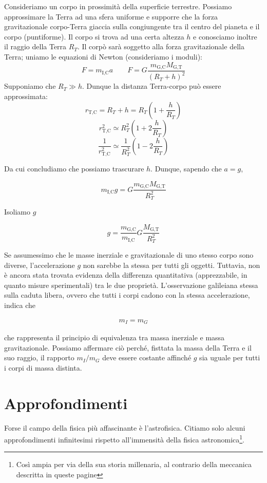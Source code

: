 Consideriamo un corpo in prossimità della superficie terrestre. Possiamo approssimare
la Terra ad una sfera uniforme e supporre che la forza gravitazionale corpo-Terra
giaccia sulla congiungente tra il centro del pianeta e il corpo (puntiforme). Il
corpo si trova ad una certa altezza $h$ e conosciamo inoltre il raggio della Terra
$R_T$. Il corpò sarà soggetto alla forza gravitazionale della Terra; uniamo le
equazioni di Newton (consideriamo i moduli):
\[ F = m_\text{I,C}a \qquad F = G\frac{m_\text{G,C}M_\text{G,T}}{(R_{T} + h)^2} \]
Supponiamo che $R_T \gg h$. Dunque la distanza Terra-corpo può essere approssimata:
\[ r_\text{T,C} = R_T + h = R_T\left(1 + \frac{h}{R_T}\right) \]
\[ r_\text{T,C}^2 \simeq R_T^2\left( 1 + 2\frac{h}{R_T} \right) \]
\[ \frac{1}{r_\text{T,C}^2} \simeq \frac{1}{R_T^2}\left( 1 - 2\frac{h}{R_T} \right) \]

\noindent Da cui concludiamo che possiamo trascurare $h$. Dunque, sapendo che
$a = g$,

\[ m_\text{I,C}g = G\frac{m_\text{G,C}M_\text{G,T}}{R_{T}^2} \]

\noindent Isoliamo $g$

\[ g = \frac{m_\text{G,C}}{m_\text{I,C}}G\frac{M_\text{G,T}}{R_{T}^2} \]

\noindent Se assumessimo che le masse inerziale e gravitazionale di uno stesso corpo
sono diverse, l'accelerazione $g$ non sarebbe la stessa per tutti gli oggetti. Tuttavia,
non è ancora stata trovata evidenza della differenza quantitativa (apprezzabile, in
quanto misure sperimentali) tra le due proprietà. L'osservazione galileiana stessa
sulla caduta libera, ovvero che tutti i corpi cadono con la stessa accelerazione,
indica che

\begin{align}
    m_I = m_G\label{equivalence}
\end{align}

\noindent che rappresenta il principio di equivalenza tra massa inerziale e massa
gravitazionale. Possiamo affermare ciò perché,
fisttata la massa della Terra e il suo raggio,
il rapporto $m_I/m_G$ deve essere costante
affinché $g$ sia uguale per tutti i corpi di massa distinta.

\section{Approfondimenti}
Forse il campo della fisica più affascinante è
l'astrofisica. Citiamo solo alcuni approfondimenti infinitesimi rispetto
all'immensità della fisica astronomica\footnote{Così ampia per via della
sua storia millenaria, al contrario della meccanica descritta in queste
pagine}.

